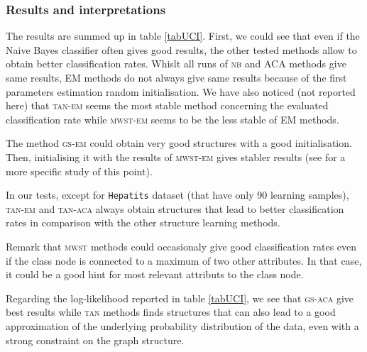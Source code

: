 \subsubsection*{Results and interpretations}



The results are summed up in table \ref{tabUCI}.
First, we could see that even if the Naive Bayes classifier often gives good results, the other tested methods allow to obtain better classification rates.
Whislt all runs of \textsc{nb} and ACA methods give same results, EM methods do not always give same results because of the first parameters estimation random initialisation.
We have also noticed (not reported here) that \textsc{tan-em} seems the most stable method concerning the evaluated classification rate while \textsc{mwst-em} seems to be the less stable of EM methods.

The method \textsc{gs-em} could obtain very good structures with a good initialisation. Then, initialising it with the results of \textsc{mwst-em} gives stabler results (see \cite{Ler05} for a more specific study of this point).

In our tests, except for \texttt{Hepatits} dataset (that have only 90 learning samples), \textsc{tan-em} and \textsc{tan-aca} always obtain structures that lead to better classification rates in comparison with the other structure learning methods.

Remark that \textsc{mwst} methods could occasionaly give good classification rates even if the class node is connected to a maximum of two other attributes. In that case, it could be a good hint for most relevant attributs to the class node.

Regarding the log-likelihood reported in table \ref{tabUCI}, we see that \textsc{gs-aca} give best results while \textsc{tan} methods finds structures that can also lead to a good approximation of the underlying probability distribution of the data, even with a strong constraint on the graph structure.

